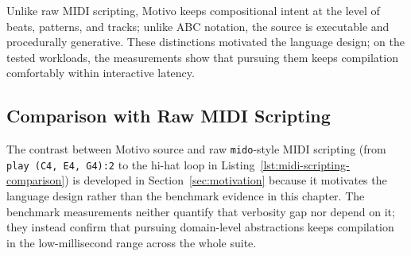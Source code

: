 Unlike raw MIDI scripting, Motivo keeps compositional intent at the level of beats, patterns, and tracks; unlike ABC
notation, the source is executable and procedurally generative.
These distinctions motivated the language design; on the tested workloads, the measurements show that pursuing them
keeps compilation comfortably within interactive latency.

\subsection{Comparison with Raw MIDI Scripting}\label{detail-subsec:comparison-with-raw-midi-scripting}

The contrast between Motivo source and raw \texttt{mido}-style MIDI scripting (from \texttt{play (C4, E4, G4):2} to
the hi-hat loop in Listing~\ref{lst:midi-scripting-comparison}) is developed in
Section~\ref{sec:motivation} because it motivates the language design rather than the benchmark evidence in
this chapter.
The benchmark measurements neither quantify that verbosity gap nor depend on it; they instead confirm that pursuing
domain-level abstractions keeps compilation in the low-millisecond range across the whole suite.
